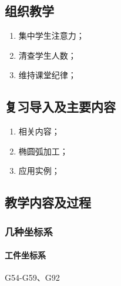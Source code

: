 \jxhj{%
	}

\makeshouye %

\subsection{组织教学}
\begin{enumerate}[\hspace{2em}1、]
	\item 集中学生注意力；
	\item 清查学生人数；
	\item 维持课堂纪律；
\end{enumerate}
\subsection{复习导入及主要内容}
\begin{enumerate}[\hspace{2em}1、]
\item 相关内容；
\item 椭圆弧加工；
\item 应用实例；
\end{enumerate}


\subsection{教学内容及过程}
\subsubsection{几种坐标系}
\paragraph{工件坐标系}
G54-G59、G92


